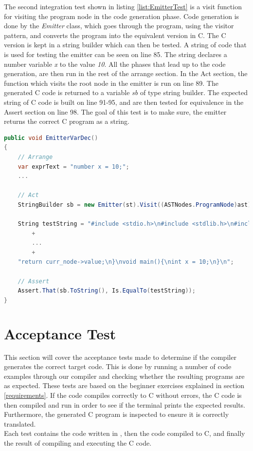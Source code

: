 \noindent The second integration test shown in listing 
\ref{list:EmitterTest} is a visit function for visiting the program node in the code generation phase. Code generation is done by the \textit{Emitter} class, which goes through the program, using the visitor pattern, and converts the program into the equivalent version in C. The C version is kept in a string builder which can then be tested. A string of \lang code that is used for testing the emitter can be seen on line 85. The string declares a number variable \textit{x} to the value \textit{10}. All the phases that lead up to the code generation, are then run in the rest of the arrange section. In the Act section, the function which visits the root node in the emitter is run on line 89. The generated C code is returned to a variable \textit{sb} of type string builder. The expected string of C code is built on line 91-95, and are then tested for equivalence in the Assert section on line 98. The goal of this test is to make sure, the emitter returns the correct C program as a string.\\

\begin{lstlisting}[language = csharp, firstnumber=82, label={list:EmitterTest}, caption=Integration test of the Emitter class used in the code generation phase - PEAKCompilerTesting / EmitterTest.cs]
public void EmitterVarDec()
{
    // Arrange
    var exprText = "number x = 10;";
    ...
    
    // Act
    StringBuilder sb = new Emitter(st).Visit((ASTNodes.ProgramNode)ast);

    String testString = "#include <stdio.h>\n#include <stdlib.h>\n#include <string.h>\nchar* concat(const char *str1, const char *str2) " 
        + 
        ...
        +
    "return curr_node->value;\n}\nvoid main(){\nint x = 10;\n}\n";

    // Assert
    Assert.That(sb.ToString(), Is.EqualTo(testString));
}
\end{lstlisting}

\section{Acceptance Test} \label{AccTest}
This section will cover the acceptance tests made to determine if the \lang compiler generates the correct target code. This is done by running a number of \lang code examples through our compiler and checking whether the resulting programs are as expected. These tests are based on the beginner exercises explained in section \ref{requirements}. If the code compiles correctly to C without errors, the C code is then compiled and run in order to see if the terminal prints the expected results. Furthermore, the generated C program is inspected to ensure it is correctly translated.\\ 
Each test contains the code written in \lang, then the code compiled to C, and finally the result of compiling and executing the C code.

